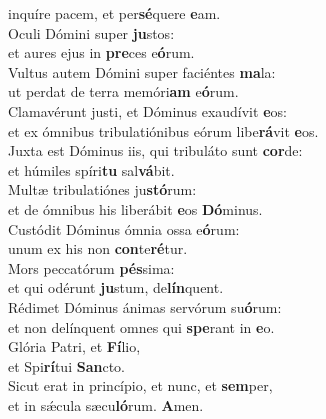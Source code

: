 \evenverse inquíre pacem, et per\textbf{sé}quere \textbf{e}am.\\
\oddverse Oculi Dómini super \textbf{ju}stos:~\*\\
\oddverse et aures ejus in \textbf{pre}ces e\textbf{ó}rum.\\
\evenverse Vultus autem Dómini super faciéntes \textbf{ma}la:~\*\\
\evenverse ut perdat de terra memóri\textbf{am} e\textbf{ó}rum.\\
\oddverse Clamavérunt justi, et Dóminus exaudívit \textbf{e}os:~\*\\
\oddverse et ex ómnibus tribulatiónibus eórum libe\textbf{rá}vit \textbf{e}os.\\
\evenverse Juxta est Dóminus iis, qui tribuláto sunt \textbf{cor}de:~\*\\
\evenverse et húmiles spíri\textbf{tu} sal\textbf{vá}bit.\\
\oddverse Multæ tribulatiónes ju\textbf{stó}rum:~\*\\
\oddverse et de ómnibus his liberábit \textbf{e}os \textbf{Dó}minus.\\
\evenverse Custódit Dóminus ómnia ossa e\textbf{ó}rum:~\*\\
\evenverse unum ex his non \textbf{con}te\textbf{ré}tur.\\
\oddverse Mors peccatórum \textbf{pés}sima:~\*\\
\oddverse et qui odérunt \textbf{ju}stum, de\textbf{lín}quent.\\
\evenverse Rédimet Dóminus ánimas servórum su\textbf{ó}rum:~\*\\
\evenverse et non delínquent omnes qui \textbf{spe}rant in \textbf{e}o.\\
\oddverse Glória Patri, et \textbf{Fí}lio,~\*\\
\oddverse et Spi\textbf{rí}tui \textbf{San}cto.\\
\evenverse Sicut erat in princípio, et nunc, et \textbf{sem}per,~\*\\
\evenverse et in sǽcula sæcu\textbf{ló}rum. \textbf{A}men.\\
